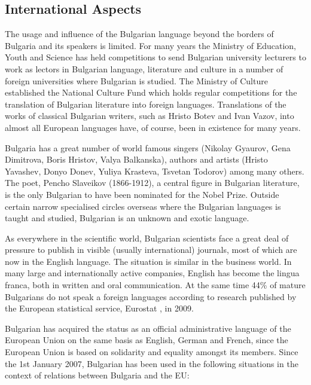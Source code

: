 \documentclass[]{../../metanetpaper}
\begin{document}
\begin{multicols}{2}
\subsection{International Aspects}

The usage and influence of the Bulgarian language beyond the borders of Bulgaria and its speakers is limited. For many years the Ministry of Education, Youth and Science has held competitions to send Bulgarian university lecturers to work as lectors in Bulgarian language, literature and culture in a number of foreign universities where Bulgarian is studied. The Ministry of Culture established the National Culture Fund which holds regular competitions for the translation of Bulgarian literature into foreign languages. Translations of the works of classical Bulgarian writers, such as Hristo Botev and Ivan Vazov, into almost all European languages have, of course, been in existence for many years. 

Bulgaria has a great number of world famous singers (Nikolay Gyaurov, Gena Dimitrova, Boris Hristov, Valya Balkanska), authors and artists (Hristo Yavashev, Donyo Donev, Yuliya Krasteva, Tsvetan Todorov) among many others. The poet, Pencho Slaveikov (1866-1912), a central figure in Bulgarian literature, is the only Bulgarian to have been nominated for the Nobel Prize. Outside certain narrow specialised circles overseas where the Bulgarian languages is taught and studied, Bulgarian is an unknown and exotic language.


As everywhere in the scientific world, Bulgarian scientists face a great deal of pressure to publish in visible (usually international) journals, most of which are now in the English language. The situation is similar in the business world. In many large and internationally active companies, English has become the lingua franca, both in written and oral communication. At the same time 44\% of mature Bulgarians do not speak a foreign languages according to research published by the European statistical service, Eurostat \cite{epp}, in 2009. 

Bulgarian has acquired the status as an official administrative language of the European Union on the same basis as English, German and French, since the European Union is based on solidarity and equality amongst its members. Since the 1st January 2007, Bulgarian has been used in the following situations in the context of relations between Bulgaria and the EU:


\end{multicols}
\end{document}
